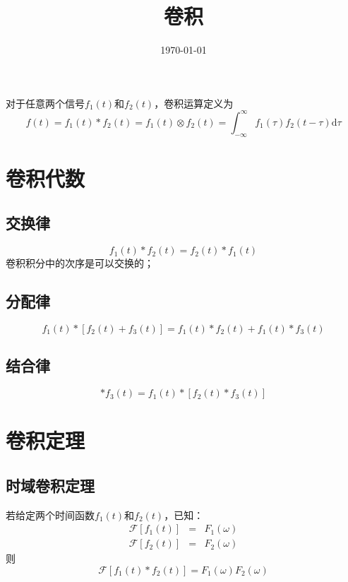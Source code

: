\documentclass[12pt,a4paper]{article}
\title{卷积}
\author{}
\date{\today}
\newcommand{\dif}{\mathrm{d}}
\begin{document}
\maketitle
对于任意两个信号$f_1(t)$和$f_2(t)$，卷积运算定义为
\begin{equation}
f(t) = f_1(t)*f_2(t) = f_1(t)\otimes f_2(t) = \int_{-\infty}^{\infty} f_1(\tau) f_2(t -\tau) \dif \tau
\end{equation}

\section{卷积代数}
\subsection{交换律}
\begin{equation}
f_1(t)*f_2(t) = f_2(t)* f_1(t)
\end{equation}
卷积积分中的次序是可以交换的；


\subsection{分配律}
\begin{equation}
f_1(t)*[f_2(t) +f_3(t)] = f_1(t)* f_2(t) + f_1(t)* f_3(t)
\end{equation}


\subsection{结合律}
\begin{equation}
[f_1(t)*f_2(t)] *f_3(t) = f_1(t)* [f_2(t)* f_3(t)]
\end{equation}



\section{卷积定理}
\subsection{时域卷积定理}
若给定两个时间函数$f_1(t)$和$f_2(t)$，已知：
\begin{eqnarray*}
\mathscr{F}[f_1(t)] &=& F_1(\omega) \\
\mathscr{F}[f_2(t)] &=& F_2(\omega)
\end{eqnarray*}
则
\begin{equation}
\mathscr{F}[f_1(t) *f_2(t)] =  F_1(\omega)F_2(\omega)
\end{equation}
\end{document}
